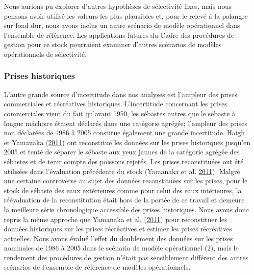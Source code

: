 \documentclass[french,11pt]{book}
\begin{document}
Nous aurions pu explorer d'autres hypothèses de sélectivité fixes, mais nous pensons avoir utilisé les valeurs les plus plausibles et, pour le relevé à la palangre sur fond dur, nous avons inclus un autre scénario de modèle opérationnel dans l'ensemble de référence. Les applications futures du Cadre des procédures de gestion pour ce stock pourraient examiner d'autres scénarios de modèles opérationnels de sélectivité.

\hypertarget{sec:discussion-uncertainties-catch}{%
\subsubsection{Prises historiques}\label{sec:discussion-uncertainties-catch}}

L'autre grande source d'incertitude dans nos analyses est l'ampleur des prises commerciales et récréatives historiques. L'incertitude concernant les prises commerciales vient du fait qu'avant 1950, les sébastes autres que le sébaste à longue mâchoire étaient déclarés dans une catégorie agrégée; l'ampleur des prises non déclarées de 1986 à 2005 constitue également une grande incertitude. Haigh et Yamanaka (\protect\hyperlink{ref-haigh2011}{2011}) ont reconstitué les données sur les prises historiques jusqu'en 2005 et tenté de séparer le sébaste aux yeux jaunes de la catégorie agrégée des sébastes et de tenir compte des poissons rejetés. Les prises reconstituées ont été utilisées dans l'évaluation précédente du stock (Yamanaka et al. \protect\hyperlink{ref-yamanaka2011}{2011}). Malgré une certaine controverse au sujet des données reconstituées sur les prises, pour le stock de sébaste des eaux extérieures comme pour celui des eaux intérieures, la réévaluation de la reconstitution était hors de la portée de ce travail et demeure la meilleure série chronologique accessible des prises historiques. Nous avons donc repris la même approche que Yamanaka et al. (\protect\hyperlink{ref-yamanaka2011}{2011}) pour reconstituer les données historiques sur les prises récréatives et estimer les prises récréatives actuelles. Nous avons évalué l'effet du doublement des données sur les prises nominales de 1986 à 2005 dans le scénario de modèle opérationnel (2), mais le rendement des procédures de gestion n'était pas sensiblement différent des autres scénarios de l'ensemble de référence de modèles opérationnels.
\end{document}
